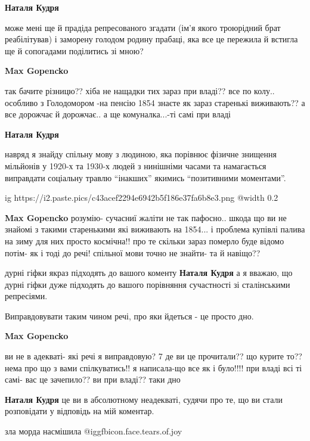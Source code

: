 \begin{itemize}
\begin{itemize}
\begin{itemize}
\textbf{Наталя Кудря} 

може мені ще й прадіда репресованого згадати (ім'я якого троюрідний брат
реабілітував) і заморену голодом родину прабаці, яка все це пережила й встигла
ще й сопогадами поділитись зі мною?


\textbf{Max Gopencko} 

так бачите різницю?? хіба не нащадки тих зараз при владі?? все по
колу.. особливо з Голодомором -на пенсію 1854 знаєте як зараз старенькі
виживають?? а все дорожчає й дорожчає.. а ще комуналка...-ті самі при владі

\textbf{Наталя Кудря} 

навряд я знайду спільну мову з людиною, яка порівнює фізичне знищення мільйонів
у 1920-х та 1930-х людей з нинішніми часами та намагається виправдати соціальну
травлю \enquote{інакших} якимись \enquote{позитивними моментами}.

\ifcmt
  ig https://i2.paste.pics/c43acef2294e6942b5f186e37fa6b8e3.png
  @width 0.2
\fi

\textbf{Max Gopencko} розумію- сучасниї жаліти не так пафосно.. шкода що ви не знайомі з такими старенькими які виживають на 1854... і проблема купівлі палива на зиму для них просто космічна!! про те скільки зараз померло буде відомо потім- як і тоді до речі! спільної мови точно не знайти- та й навіщо??

дурні гіфки якраз підходять до вашого коменту
\textbf{Наталя Кудря} а я вважаю, що дурні гіфки дуже підходять до вашого порівняння сучастності зі сталінськими репресіями.

Виправдовувати таким чином речі, про яки йдеться - це просто дно.

\textbf{Max Gopencko} 

ви не в адекваті- які речі я виправдовую? 7 де ви це прочитали?? що курите то??
нема про що з вами спілкуватись!! я написала-що все як і було!!!! при владі всі
ті самі- вас це зачепило?? ви при владі?? таки дно


\textbf{Наталя Кудря} це ви в абсолютному неадекваті, судячи про те, що ви стали розповідати у відповідь на мій коментар.

зла морда насмішила  @igg{fbicon.face.tears.of.joy} 

\end{itemize} %


\end{itemize}
\end{itemize}
